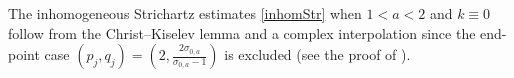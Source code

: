 \documentclass[10pt,a4paper]{amsart}
\numberwithin{equation}{section}
\def\s{\sigma}
\begin{document}
The inhomogeneous Strichartz estimates \eqref{inhomStr} when $1<a<2$ and $k\equiv 0$ follow from the Christ--Kiselev lemma \cite{CK} and a complex interpolation since the end-point case $(p_j,q_j)=(2,\frac{2\s_{0,a}}{\s_{0,a}-1})$ is excluded (see the proof of \cite[Theorem 6]{BT}).
\end{document}
